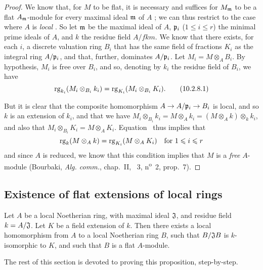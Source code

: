 \begin{proof}
\label{proof-0.10.2.8}
We know that, for $M$ to be flat, it is necessary and suffices for $M_\mathfrak{m}$ to be a flat $A_\mathfrak{m}$-module for every maximal ideal $\mathfrak{m}$ of $A$ ;
we can thus restrict to the case where $A$ is \emph{local} .
So let $\mathfrak{m}$ be the maximal ideal of $A$, $\mathfrak{p}_i$ ($1\leq i\leq r$) the minimal prime ideals of $A$, and $k$ the residue field $A/fk{m}$.
We know  that there exists, for each $i$, a discrete valuation ring $B_i$ that has the same field of fractions $K_i$ as the integral ring $A/\mathfrak{p}_i$, and that, further, dominates $A/\mathfrak{p}_i$.
Let $M_i=M\otimes_A B_i$.
By hypothesis, $M_i$ is free over $B_i$, and so, denoting by $k_i$ the residue field of $B_i$, we have
\begin{equation*}
\label{0.10.2.8.1}
    {\mathop{\mathrm{rg}}\nolimits}_{k_i}(M_i\otimes_{B_i}k_i) = {\mathop{\mathrm{rg}}\nolimits}_{K_i}(M_i\otimes_{B_i}K_i).\tag{10.2.8.1}
\end{equation*}

But it is clear that the composite homomorphism $A\to A/\fk{p}_i\to B_i$ is local, and so $k$ is an extension of $k_i$, and that we have $M_i\otimes_{B_i}k_i = M\otimes_A k_i = (M\otimes_A k)\otimes_k k_i$, and also that $M_i\otimes_{B_i}K_i = M\otimes_A K_i$.
Equation~ thus implies that
\[
    {\mathop{\mathrm{rg}}\nolimits}_k(M\otimes_A k) = {\mathop{\mathrm{rg}}\nolimits}_{K_i}(M\otimes_A K_i) \quad\mbox{for $1\leqslant i\leqslant r$}
\]
and since $A$ is reduced, we know that this condition implies that $M$ is a \emph{free} $A$-module (Bourbaki, \emph{Alg. comm.}, chap.~II, \textsection~3, n\textsuperscript{o}~2, prop.~7).
\end{proof}

\subsection{Existence of flat extensions of local rings}
\label{subsection:existence-of-flat-extensions-of-local-rings}

\begin{prop}[10.3.1]
\label{0.10.3.1}
Let $A$ be a local Noetherian ring, with maximal ideal $\mathfrak{J}$, and residue field $k=A/\mathfrak{J}$.
Let $K$ be a field extension of $k$.
Then there exists a local homomorphism from $A$ to a local Noetherian ring $B$, such that $B/\mathfrak{J}B$ is $k$-isomorphic to $K$, and such that $B$ is a flat $A$-module.
\end{prop}

The rest of this section is devoted to proving this proposition, step-by-step.

